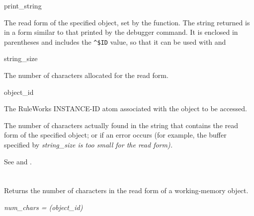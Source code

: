 \begin{arguments}
\item[print\_string]

  The read form of the specified object, set by the function. The
  string returned is in a form similar to that printed by the
   debugger command. It is enclosed in parentheses and
  includes the
  \verb|^$ID| value, so that it can be used with
   and 

\item[string\_size]

  The number of characters allocated for the read form.

\item[object\_id]

  The RuleWorks INSTANCE-ID atom associated with the object to be
  accessed.
\end{arguments}

\ReturnValue

The number of characters actually found in the string that contains
the read form of the specified object; or 
if an error occurs (for example, the buffer specified by \it{string\_size}
is too small for the read form).

\Example

See  and .

\begin{seealso}






\end{seealso}

\section*{}

Returns the number of characters in the read form of a working-memory
object.

\Syntax

\it{num\_chars} = (\it{object\_id})

